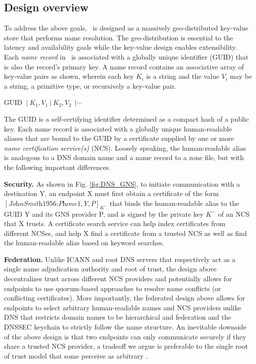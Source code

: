 \subsection{Design overview}


To address the above goals, \auspice\ is designed as a massively geo-distributed key-value store that performs name resolution. The geo-distribution is essential to the latency and availability goals while the key-value design enables extensibility. Each {\em name record} in \auspice\ is associated with a globally unique identifier (GUID) that is also the record's primary key. A name record contains an associative array of key-value pairs as shown, wherein each key $K_i$ is a string and the value $V_i$ may be a string, a primitive type, or recursively a key-value pair.

GUID  $\ | \ K_1, V_1 \ | \ K_2, V_2 \ \ | \cdots $

The GUID is a self-certifying identifier determined as a compact hash of a public key. Each name record is associated with a globally unique human-readable aliases that are bound to the GUID by a certificate supplied by one or more {\em name certification service(s)} (NCS). Loosely speaking, the human-readable alias is analogous to a DNS domain name and a name record to a zone file, but with the following important differences.

{\bf{Security.}} As shown in Fig. \ref{fig:DNS_GNS}, to initiate communication with a destination Y, an endpoint X must first obtain a certificate of the form $[\textit{JohnSmith1956:Phone1}, Y, P]_{K^-}$ that binds the human-readable alias to the GUID Y and its GNS provider P, and is signed by the private key $K^-$ of an NCS that X trusts. A certificate search service can help index certificates from different NCSes, and help X find a certificate from a trusted NCS as well as find the human-readable alias based on keyword searches. 

{\bf{Federation.}} Unlike ICANN and root DNS servers that respectively act as a single name adjudication authority and root of trust, the design above decentralizes trust across different NCS providers and potentially allows for endpoints to use quorum-based approaches to resolve name conflicts (or conflicting certificates). More importantly, the federated design above allows for endpoints to select arbitrary human-readable names and NCS providers unlike DNS that restricts domain names to be hierarchical and federation and the DNSSEC keychain to strictly follow the name structure. An inevitable downside of the above design is that two endpoints can only communicate securely if they share a trusted NCS provider, a tradeoff we argue is preferable to the single root of trust model that some perceive as arbitrary \cite{ICANN-debate-Sems,ICANN-debate-Gross}. 

